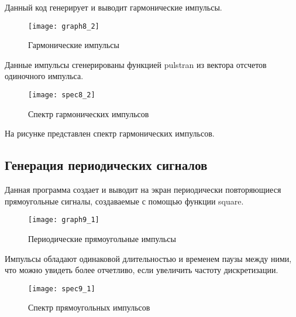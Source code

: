 
\parindent=1cm
Данный код генерирует и выводит гармонические импульсы.

\begin{figure}[H]
	\begin{center}
		\texttt{[image: graph8\_2]}
		\caption{Гармонические импульсы} 
		\label{pic:graph8_2} %
	\end{center}
\end{figure}
Данные импульсы сгенерированы функцией pulstran из вектора отсчетов одиночного импульса.
\begin{figure}[H]
	\begin{center}
		\texttt{[image: spec8\_2]}
		\caption{Спектр гармонических импульсов} 
		\label{pic:spec8_2} %
	\end{center}
\end{figure}
На рисунке представлен спектр гармонических импульсов.


\subsection{Генерация периодических сигналов}


\parindent=1cm
Данная программа создает и выводит на экран периодически повторяющиеся прямоугольные сигналы, создаваемые с помощью функции square.

\begin{figure}[H]
	\begin{center}
		\texttt{[image: graph9\_1]}
		\caption{Периодические прямоугольные импульсы} 
		\label{pic:graph9_1} %
	\end{center}
\end{figure}
Импульсы обладают одинаковой длительностью и временем паузы между ними, что можно увидеть более отчетливо, если увеличить частоту дискретизации.
\begin{figure}[H]
	\begin{center}
		\texttt{[image: spec9\_1]}
		\caption{Спектр прямоугольных импульсов} 
		\label{pic:spec9_1} %
	\end{center}
\end{figure}


